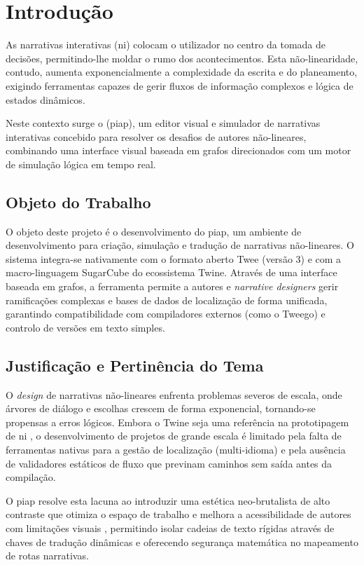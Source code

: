 \chapter{Introdução}
\label{cp:introduction}

As narrativas interativas (\gls{ni}) colocam o utilizador no centro da tomada de decisões, permitindo-lhe moldar o rumo dos acontecimentos. Esta não-linearidade, contudo, aumenta exponencialmente a complexidade da escrita e do planeamento, exigindo ferramentas capazes de gerir fluxos de informação complexos e lógica de estados dinâmicos.

Neste contexto surge o (\gls{piap}), um editor visual e simulador de narrativas interativas concebido para resolver os desafios de autores não-lineares, combinando uma interface visual baseada em grafos direcionados com um motor de simulação lógica em tempo real.

\section{Objeto do Trabalho}
O objeto deste projeto é o desenvolvimento do \gls{piap}, um ambiente de desenvolvimento para criação, simulação e tradução de narrativas não-lineares. O sistema integra-se nativamente com o formato aberto Twee (versão 3) e com a macro-linguagem SugarCube do ecossistema Twine. Através de uma interface baseada em grafos, a ferramenta permite a autores e \textit{narrative designers} gerir ramificações complexas e bases de dados de localização de forma unificada, garantindo compatibilidade com compiladores externos (como o Tweego) e controlo de versões em texto simples.

\section{Justificação e Pertinência do Tema}
O \textit{design} de narrativas não-lineares enfrenta problemas severos de escala, onde árvores de diálogo e escolhas crescem de forma exponencial, tornando-se propensas a erros lógicos. Embora o Twine seja uma referência na prototipagem de \gls{ni} \citep{IFTFGDC2026}, o desenvolvimento de projetos de grande escala é limitado pela falta de ferramentas nativas para a gestão de localização (multi-idioma) e pela ausência de validadores estáticos de fluxo que previnam caminhos sem saída antes da compilação.

O \gls{piap} resolve esta lacuna ao introduzir uma estética neo-brutalista de alto contraste que otimiza o espaço de trabalho e melhora a acessibilidade de autores com limitações visuais \citep{Malewicz2022, Sheikh2025}, permitindo isolar cadeias de texto rígidas através de chaves de tradução dinâmicas e oferecendo segurança matemática no mapeamento de rotas narrativas.

